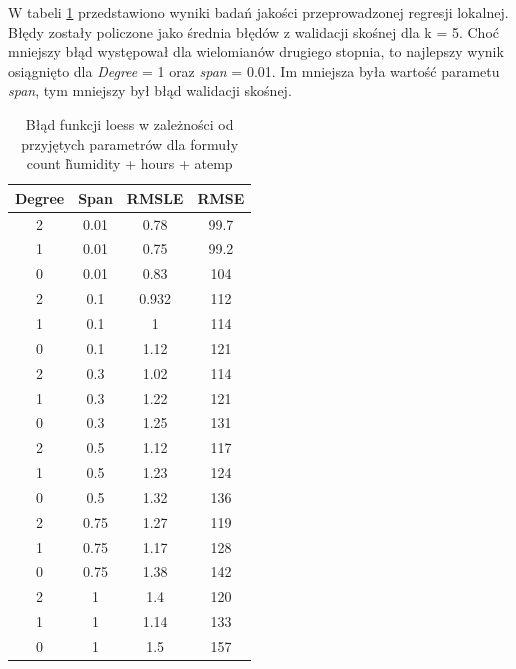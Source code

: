 \documentclass[a4paper,12pt]{article}
\begin{document}
        W tabeli \ref{tab:loess} przedstawiono wyniki badań jakości przeprowadzonej regresji lokalnej. Błędy zostały policzone jako średnia błędów z walidacji skośnej dla k = 5. Choć mniejszy błąd występował dla wielomianów drugiego stopnia, to najlepszy wynik osiągnięto dla \textit{Degree} = 1 oraz \textit{span} = 0.01. Im mniejsza była wartość parametu \textit{span}, tym mniejszy był błąd walidacji skośnej.
        
        
        \begin{table}[h]
            \begin{tabular}{|c|c|c|c|}
                \hline
                Degree & Span & RMSLE & RMSE \\
                \hline
                2 & 0.01 & 0.78
                & 99.7 \\
                \hline
                1 & 0.01 & 0.75 & 99.2 \\
                \hline
                0 & 0.01 & 0.83 & 104 \\
                \hline
                2 & 0.1 & 0.932 & 112 \\
                \hline
                1 & 0.1 & 1 & 114 \\
                \hline
                0 & 0.1 & 1.12 & 121 \\
                \hline
                2 & 0.3 & 1.02 & 114 \\
                \hline
                1 & 0.3 & 1.22 & 121 \\
                \hline
                0 & 0.3 & 1.25 & 131 \\
                \hline
                2 & 0.5 & 1.12 & 117 \\
                \hline
                1 & 0.5 & 1.23 & 124 \\
                \hline
                0 & 0.5 & 1.32 & 136 \\
                \hline
                2 & 0.75 & 1.27 & 119 \\
                \hline
                1 & 0.75 & 1.17 & 128 \\
                \hline
                0 & 0.75 & 1.38 & 142 \\
                \hline
                2 & 1 & 1.4 & 120 \\
                \hline
                1 & 1 & 1.14 & 133 \\
                \hline
                0 & 1 & 1.5 & 157 \\
                \hline
            \end{tabular}
            \caption{Błąd funkcji loess w zależności od przyjętych parametrów dla formuły count \~ humidity + hours + atemp}
            \label{tab:loess}
        \end{table}
        
\end{document}

